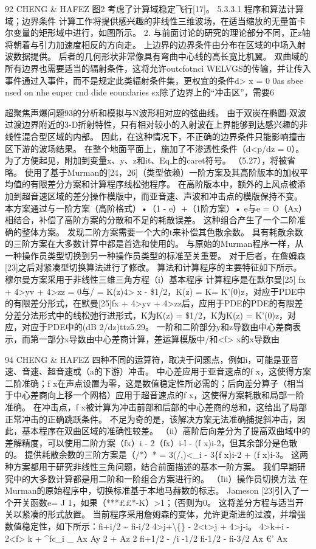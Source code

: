 \documentclass[UTF8,11pt,a4paper,openany,fontset=fandol]{ctexbook}
\begin{document}
92 CHENG \& HAFEZ 图2 考虑了计算域稳定飞行[17]。 5.3.3.1 程序和算法计算域；边界条件 计算工作将提供感兴趣的非线性三维波场，在适当缩放的无量笛卡尔变量的矩形域中进行，如图所示。 2. 与前面讨论的研究的理论部分不同，正z轴将朝着与引力加速度相反的方向走。 上边界的边界条件由分布在区域的中场入射波数据提供。 后者的几何形状非常像具有弯曲中心线的高长宽比机翼。 双曲域的所有边界也需要适当的辐射条件，这将允许outcfotnci WELVGS的传输，并让传入事件通过入事件，而不是规定此类辐射条件集，更权宜的条件d> x = 0 0as sbee nsed on nhe euper rnd dide eoundaries sx除了边界上的“冲击区”，需要6

超聚焦声爆问题93的分析和模拟与N波形相对应的弦曲线。 由于双炭在椭圆-双波过渡边界附近的3-D折射特性，只有相对较小的入射波在上界能够到达感兴趣的非线性混合型区域的内部。 因此，在这种情况下，不正确的边界条件只能影响撞击区下游的波场结果。 在整个地面平面上，施加了不渗透性条件（d<p/dz = 0）。 为了方便起见，附加到变量x、y、z和it、Eq上的caret符号。 （5.27），将被省略。 使用了基于Murman的[24，26]（类型依赖）一阶方案及其高阶版本的加权平均值的有限差分方案和计算程序线松弛程序。 在高阶版本中，额外的上风点被添加到超音速区域的差分操作模版中，而亚音速、声波和冲击点的模版保持不变。 本方案通过与一阶方案（高阶格式）•（1 - e）+（1阶方案）• e与e = O（Ax）相结合，补偿了高阶方案的分散和不足的耗散误差。 这种组合产生了一个二阶准确的整体方案。 发现二阶方案需要一个大的t来补偿其色散余数。 具有耗散余数的三阶方案在大多数计算中都是首选和使用的。 与原始的Murman程序一样，从一种操作员类型切换到另一种操作员类型的标准至关重要。 对于后者，在詹姆森[23]之后对紧凑型切换算法进行了修改。 算法和计算程序的主要特征如下所示。 穆尔曼方案采用于非线性三维三角方程（i）基本程序 计算程序是在默尔曼[25] fx + 4>yv + 4>zz = 0与/ = K(z)4> x - \$1/2，K(z) = K= K'(0)z，对应于PDE中的有限差分形式，在默曼[25]fx + 4>yv + 4>zz后，应用于PDE的PDE的有限差分差分法形式中的线松弛行进形式，K为K(z) = \$1/2，K为K(z) = K'(0)z，对应，对应于PDE中的(dB 2/dz)ttz5.29。 一阶和二阶部分y和z导数由中心差商表示，而第一部分x导数由中心差商计算，差运算模版中/和<f> x的x导数由

94 CHENG \& HAFEZ 四种不同的运算符，取决于问题点，例如i，可能是亚音速、音速、超音速或（a的下游）冲击。 中心差应用于亚音速点的f x，这使得方案二阶准确；f x在声点设置为零，这是数值稳定性所必需的；后向差分算子（相当于中心差商向上移一个网格）应用于超音速点的f x，这使得方案耗散和局部一阶准确。 在冲击点，f x被计算为冲击前部和后部的中心差商的总和，这给出了局部正常冲击的正确跳跃条件。 不足为奇的是，该解决方案无法准确捕捉斜冲击，因此，基本程序在双曲区域的准确性较差。 （ii）高阶后向差分为了提高双曲域中的差解精度，可以使用二阶方案（fx）i - 2（fx）i-l - (f x)i-2，但其余部分是色散的。 提供耗散余数的三阶方案是（/*）* = 3(/,)<\_i - 3\{f x)i-2 + (f x)i-3。 这两种方案都用于研究非线性三角问题，结合前面描述的基本一阶方案。 我们早期研究中的大多数计算都是用二阶和一阶组合方案进行的。 （Iii）操作员切换方法 在Murman的原始程序中，切换标准基于本地马赫数的标志。 Jameson [23]引入了一个开关函数e= J 1，如果（***££*-K）>1；（否则为0。 这将差分方程与适当开关以紧凑的形式放置。 当前程序采用詹姆森的变体，允许更渐进的过渡，并增强数值稳定性，如下所示：fi+i/2 \textasciitilde{} fi-i/2 4>j+\textbackslash\{\} - 2<t>j + 4>j-i。 4>k+i - 2<f> k + \textasciicircum{}fc\_i \_ Ax Ay 2 + Az 2 fi+1/2 - /i -1/2 fi-1/2 - fi-3/2 Ax €' Ax
\end{document}
